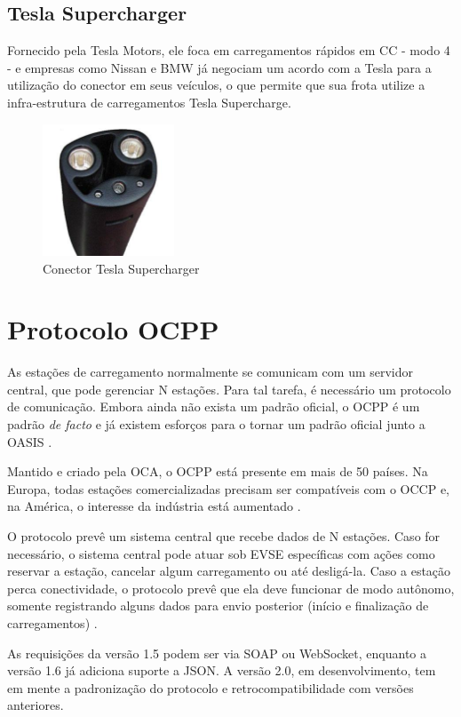       \subsection{Tesla Supercharger}
      \label{stateofart:plugs:tesla}

        Fornecido pela Tesla Motors, ele foca em carregamentos rápidos em \ac{CC} - modo 4 - e empresas como Nissan e BMW já negociam um acordo com a Tesla para a utilização do conector em seus veículos, o que permite que sua frota utilize a infra-estrutura de carregamentos Tesla Supercharge.

        \begin{figure}[H]
          \begin{center}
            \includegraphics[width=0.35\textwidth,natwidth=300,natheight=300]{assets/images/connectors-tesla.jpg}
            \caption{Conector Tesla Supercharger}
            \label{fig:tesla}
          \end{center}
        \end{figure}

  \section{Protocolo OCPP}
  \label{stateofart:ocpp}

    As estações de carregamento normalmente se comunicam com um servidor central, que pode gerenciar N estações. Para tal tarefa, é necessário um protocolo de comunicação. Embora ainda não exista um padrão oficial, o \ac{OCPP} é um padrão \textit{de facto} e já existem esforços para o tornar um padrão oficial junto a \ac{OASIS} \cite{ocpp-news-standardization}.

    Mantido e criado pela \ac{OCA}, o OCPP está presente em mais de 50 países. Na Europa, todas estações comercializadas precisam ser compatíveis com o OCCP e, na América, o interesse da indústria está aumentado \cite{forbes-news-ocpp}.

    O protocolo prevê um sistema central que recebe dados de N estações. Caso for necessário, o sistema central pode atuar sob \ac{EVSE} específicas com ações como reservar a estação, cancelar algum carregamento ou até desligá-la. Caso a estação perca conectividade, o protocolo prevê que ela deve funcionar de modo autônomo, somente registrando alguns dados para envio posterior (início e finalização de carregamentos) \cite{ocpp-spec-15}.

    As requisições da versão 1.5 podem ser via SOAP ou WebSocket, enquanto a versão 1.6 já adiciona suporte a JSON. A versão 2.0, em desenvolvimento, tem em mente a padronização do protocolo e retrocompatibilidade com versões anteriores.
